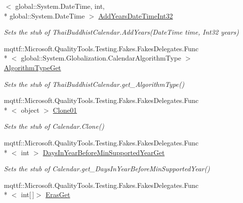 \begin{DoxyCompactItemize}
$<$ global\-::\-System.\-Date\-Time, int, \\*
global\-::\-System.\-Date\-Time $>$ \hyperlink{class_system_1_1_globalization_1_1_fakes_1_1_stub_thai_buddhist_calendar_aeb2d82c03bf926a3e0f6faff1ec1097a}{Add\-Years\-Date\-Time\-Int32}
\begin{DoxyCompactList}\small\item\em Sets the stub of Thai\-Buddhist\-Calendar.\-Add\-Years(\-Date\-Time time, Int32 years)\end{DoxyCompactList}\item 
mqttf\-::\-Microsoft.\-Quality\-Tools.\-Testing.\-Fakes.\-Fakes\-Delegates.\-Func\\*
$<$ global\-::\-System.\-Globalization.\-Calendar\-Algorithm\-Type $>$ \hyperlink{class_system_1_1_globalization_1_1_fakes_1_1_stub_thai_buddhist_calendar_a4a8bfce279e9901d0f76c3b01de53cf4}{Algorithm\-Type\-Get}
\begin{DoxyCompactList}\small\item\em Sets the stub of Thai\-Buddhist\-Calendar.\-get\-\_\-\-Algorithm\-Type()\end{DoxyCompactList}\item 
mqttf\-::\-Microsoft.\-Quality\-Tools.\-Testing.\-Fakes.\-Fakes\-Delegates.\-Func\\*
$<$ object $>$ \hyperlink{class_system_1_1_globalization_1_1_fakes_1_1_stub_thai_buddhist_calendar_a60d64d3feabb016e466ed99c15ddce9e}{Clone01}
\begin{DoxyCompactList}\small\item\em Sets the stub of Calendar.\-Clone()\end{DoxyCompactList}\item 
mqttf\-::\-Microsoft.\-Quality\-Tools.\-Testing.\-Fakes.\-Fakes\-Delegates.\-Func\\*
$<$ int $>$ \hyperlink{class_system_1_1_globalization_1_1_fakes_1_1_stub_thai_buddhist_calendar_aedce832b4f7ce261e8f18144b17dbdfd}{Days\-In\-Year\-Before\-Min\-Supported\-Year\-Get}
\begin{DoxyCompactList}\small\item\em Sets the stub of Calendar.\-get\-\_\-\-Days\-In\-Year\-Before\-Min\-Supported\-Year()\end{DoxyCompactList}\item 
mqttf\-::\-Microsoft.\-Quality\-Tools.\-Testing.\-Fakes.\-Fakes\-Delegates.\-Func\\*
$<$ int\mbox{[}$\,$\mbox{]}$>$ \hyperlink{class_system_1_1_globalization_1_1_fakes_1_1_stub_thai_buddhist_calendar_a08f1178d956f936ffb06d86581fc8b4f}{Eras\-Get}

\end{DoxyCompactItemize}
